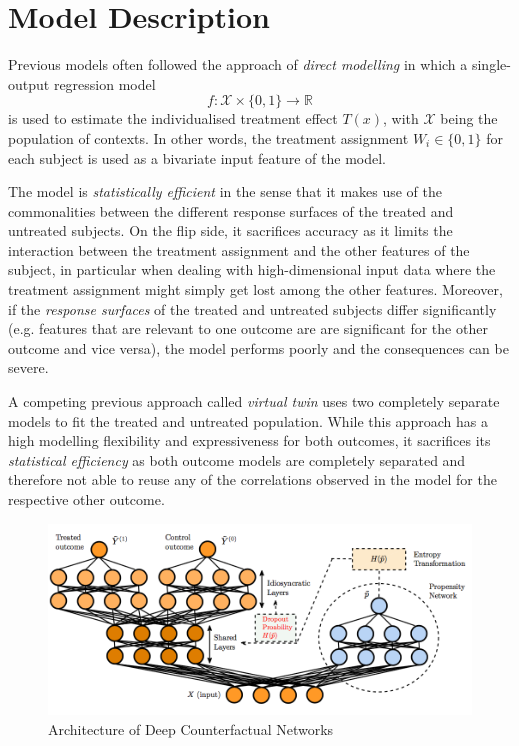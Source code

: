 \section{Model Description}
Previous models often followed the approach of \emph{direct modelling} in which a single-output regression model 
\begin{equation}
f: \mathcal{X} \times \{0,1\} \rightarrow \mathbb{R}
\end{equation}
is used to estimate the individualised treatment effect $T(x)$, with $\mathcal{X}$ being the population of contexts. In other words, the treatment assignment $W_i \in \{0,1\}$ for each subject is used as a bivariate input feature of the model. 

  The model is \emph{statistically efficient} in the sense that it makes use of the commonalities between the different response surfaces of the treated and untreated subjects. On the flip side, it sacrifices accuracy as it limits the interaction between the treatment assignment and the other features of the subject, in particular when dealing with  high-dimensional input data where the treatment assignment might simply get lost among the other features. Moreover, if the \emph{response surfaces} of the treated and untreated subjects differ significantly (e.g. features that are relevant to one outcome are are significant for the other outcome and vice versa), the model performs poorly and the consequences can be severe. 

A competing previous approach called \emph{virtual twin} uses two completely separate models to fit the treated and untreated population. %
While this approach has a high modelling flexibility and expressiveness for both outcomes, it sacrifices its \emph{statistical efficiency} as both outcome models are completely separated and therefore not able to reuse any of the correlations observed in the model for the respective other outcome. 




\begin{figure}[h]
	\centering
	\includegraphics[width=1.0\textwidth]{figures/chapter-3/pbd-architecture.png}
	\caption{Architecture of Deep Counterfactual Networks}\label{fig:dcn-architecture}
\end{figure}

